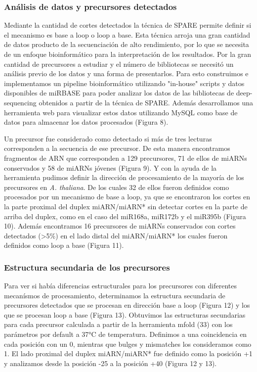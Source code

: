 \subsubsection{Análisis de datos y precursores detectados}
Mediante la cantidad de cortes detectados la técnica de SPARE permite definir si el mecanismo es base a loop o loop a base.
Esta técnica arroja una gran cantidad de datos producto de la secuenciación de alto rendimiento, por lo que se necesita de un enfoque bioinformático para la interpretación de los resultados.
Por la gran cantidad de precursores a estudiar y el número de bibliotecas se necesitó un análisis previo de los datos y una forma de presentarlos.
Para esto construimos e implementamos un pipeline bioinformático utilizando "in-house" scripts y datos disponibles de miRBASE para poder analizar los datos de las bibliotecas de deep-sequencing obtenidos a partir de la técnica de SPARE.
Además desarrollamos una herramienta web para visualizar estos datos utilizando MySQL como base de datos para almacenar los datos procesados (Figura 8).

Un precursor fue considerado como detectado si más de tres lecturas corresponden a la secuencia de ese precursor.
De esta manera encontramos fragmentos de ARN que corresponden a 129 precursores, 71 de ellos de miARNs conservados y 58 de miARNs jóvenes (Figura 9).
Y con la ayuda de la herramienta pudimos definir la dirección de procesamiento de la mayoría de los precursores en \textit{A. thaliana}.
De los cuales 32 de ellos fueron definidos como procesados por un mecanismo de base a loop, ya que se encontraron los cortes en la parte proximal del duplex miARN/miARN* sin detectar cortes en la parte de arriba del duplex, como en el caso del miR168a, miR172b y el miR395b (Figura 10).
Además encontramos 16 precursores de miARNs conservados con cortes detectados (>5\%) en el lado distal del miARN/miARN* los cuales fueron definidos como loop a base (Figura 11).

\subsubsection{Estructura secundaria de los precursores}
Para ver si había diferencias estructurales para los precursores con diferentes mecanísmos de procesamiento, determinamos la estructura secundaria de precursores detectados que se procesan en dirección base a loop (Figura 12) y los que se procesan loop a base (Figura 13).
Obtuvimos las estructuras secundarias para cada precursor calculada a partir de la herramienta mfold (33) con los parámetros por default a 37°C de temperatura.
Definimos a una coincidencia en cada posición con un 0, mientras que bulges y mismatches los consideramos como 1.
El lado proximal del duplex miARN/miARN* fue definido como la posición +1 y analizamos desde la posición -25 a la posición +40 (Figura 12 y 13). 

